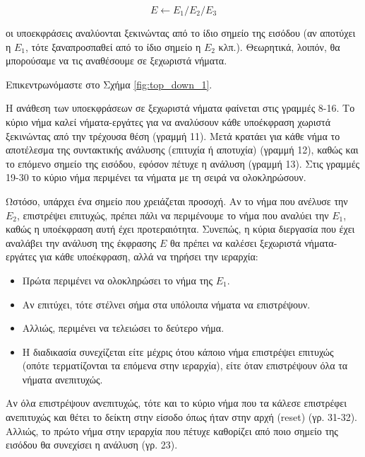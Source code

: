 \begin{equation}
	E \leftarrow E_1 / E_2 /  E_3
\end{equation}

οι υποεκφράσεις αναλύονται ξεκινώντας από το ίδιο σημείο της εισόδου (αν αποτύχει η $E_1$, τότε ξαναπροσπαθεί από το ίδιο σημείο η $E_2$ κλπ.).
Θεωρητικά, λοιπόν, θα μπορούσαμε να τις αναθέσουμε σε ξεχωριστά νήματα.

Επικεντρωνόμαστε στο Σχήμα \ref{fig:top_down_1}.

Η ανάθεση των υποεκφράσεων σε ξεχωριστά νήματα φαίνεται στις γραμμές 8-16.
Το κύριο νήμα καλεί νήματα-εργάτες για να αναλύσουν κάθε υποέκφραση χωριστά ξεκινώντας από την τρέχουσα θέση (γραμμή 11).
Μετά κρατάει για κάθε νήμα το αποτέλεσμα της συντακτικής ανάλυσης (επιτυχία ή αποτυχία) (γραμμή 12), καθώς και το επόμενο σημείο της εισόδου, εφόσον πέτυχε η ανάλυση (γραμμή 13).
Στις γραμμές 19-30 το κύριο νήμα περιμένει τα νήματα με τη σειρά να ολοκληρώσουν.

Ωστόσο, υπάρχει ένα σημείο που χρειάζεται προσοχή.
Αν το νήμα που ανέλυσε την $E_2$, επιστρέψει επιτυχώς, πρέπει πάλι να περιμένουμε το νήμα που αναλύει την $E_1$, καθώς η υποέκφραση αυτή έχει προτεραιότητα.
Συνεπώς, η κύρια διεργασία που έχει αναλάβει την ανάλυση της έκφρασης $E$ θα πρέπει να καλέσει ξεχωριστά νήματα-εργάτες για κάθε υποέκφραση, αλλά να τηρήσει την ιεραρχία:

\begin{itemize}
	\item Πρώτα περιμένει να ολοκληρώσει το νήμα της $E_1$.
	\item Αν επιτύχει, τότε στέλνει σήμα στα υπόλοιπα νήματα να επιστρέψουν.
	\item Αλλιώς, περιμένει να τελειώσει το δεύτερο νήμα.
	\item Η διαδικασία συνεχίζεται είτε μέχρις ότου κάποιο νήμα επιστρέψει επιτυχώς (οπότε τερματίζονται τα 
	  επόμενα στην ιεραρχία), είτε όταν επιστρέψουν όλα τα νήματα ανεπιτυχώς. 
\end{itemize}

Αν όλα επιστρέψουν ανεπιτυχώς, τότε και το κύριο νήμα που τα κάλεσε επιστρέφει ανεπιτυχώς και θέτει το δείκτη στην είσοδο όπως ήταν στην αρχή (reset) (γρ. 31-32).
Αλλιώς, το πρώτο νήμα στην ιεραρχία που πέτυχε καθορίζει από ποιο σημείο της εισόδου θα συνεχίσει η ανάλυση (γρ. 23).

